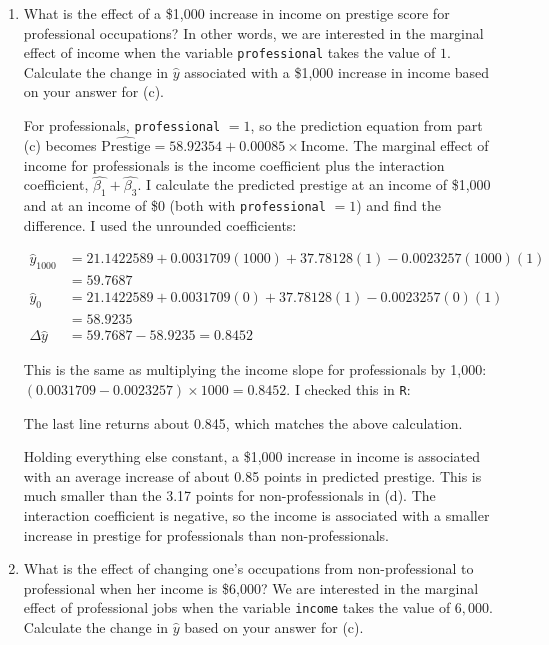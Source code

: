 \documentclass[12pt,letterpaper]{article}
\begin{document}
\begin{enumerate}
		\newpage
		\item [(f)]
		What is the effect of a \$1,000 increase in income on prestige score for professional occupations? In other words, we are interested in the marginal effect of income when the variable \texttt{professional} takes the value of $1$. Calculate the change in $\hat{y}$ associated with a \$1,000 increase in income based on your answer for (c).
		\vspace{.25cm}
		
		\noindent For professionals, \texttt{professional} $= 1$, so the prediction equation from part (c) becomes $\widehat{\text{Prestige}} = 58.92354 + 0.00085 \times \text{Income}$. The marginal effect of income for professionals is the income coefficient plus the interaction coefficient, $\hat{\beta_1} + \hat{\beta_3}$. I calculate the predicted prestige at an income of \$1,000 and at an income of \$0 (both with \texttt{professional} $= 1$) and find the difference. I used the unrounded coefficients:
		
		\begin{align*}
			\hat{y}_{1000} &= 21.1422589 + 0.0031709(1000) + 37.78128(1) - 0.0023257(1000)(1) \\
			&= 59.7687 \\
			\hat{y}_{0} &= 21.1422589 + 0.0031709(0) + 37.78128(1) - 0.0023257(0)(1) \\
			&= 58.9235 \\
			\Delta\hat{y} &= 59.7687 - 58.9235 = 0.8452
		\end{align*}
		
		\noindent This is the same as multiplying the income slope for professionals by 1,000: $(0.0031709 - 0.0023257) \times 1000 = 0.8452$. I checked this in \texttt{R}:
		
		\noindent The last line returns about 0.845, which matches the above calculation.
		\vspace{.25cm}
	
		\noindent Holding everything else constant, a \$1,000 increase in income is associated with an average increase of about 0.85 points in predicted prestige. This is much smaller than the 3.17 points for non-professionals in (d). The interaction coefficient is negative, so the income is associated with a smaller increase in prestige for professionals than non-professionals. 
		\vspace{.5cm}
		
		\item [(g)]
		What is the effect of changing one's occupations from non-professional to professional when her income is \$6,000? We are interested in the marginal effect of professional jobs when the variable \texttt{income} takes the value of $6,000$. Calculate the change in $\hat{y}$ based on your answer for (c).
		\vspace{.25cm}
		

\end{enumerate}
\end{document}
